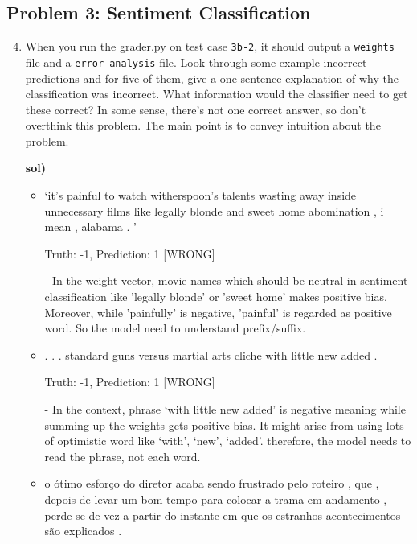 \documentclass[a4paper]{article}
\begin{document}
\subsection*{Problem 3: Sentiment Classification}
    \begin{enumerate}[label=\alph*.]
        \setcounter{enumi}{3}
        \item   When you run the grader.py on test case \texttt{3b-2}, it should output a \texttt{weights}
        file and a \texttt{error-analysis} file.
        Look through some example incorrect predictions and for five of them,
        give a one-sentence explanation of why the classification was incorrect.
        What information would the classifier need to get these correct?
        In some sense, there's not one correct answer, so don't overthink this problem.
        The main point is to convey intuition about the problem.

        \medskip \textbf{sol)}

        \begin{itemize}
            \item `it's painful to watch witherspoon's talents wasting away inside unnecessary films like legally blonde and sweet home abomination , i mean , alabama . '
            
            Truth: -1, Prediction: 1 [WRONG]

            - In the weight vector, movie names which should be neutral in sentiment classification like 'legally blonde' or 'sweet home' makes positive bias.
            Moreover, while 'painfully' is negative, 'painful' is regarded as positive word. So the model need to understand prefix/suffix. 
        
            \item . . . standard guns versus martial arts cliche with little new added .
            
            Truth: -1, Prediction: 1 [WRONG]

            - In the context, phrase `with little new added' is negative meaning while summing up the weights gets positive bias.
            It might arise from using lots of optimistic word like `with', `new', `added'. therefore, the model needs to read the phrase, not each word.
        
            \item o ótimo esforço do diretor acaba sendo frustrado pelo roteiro , que , depois de levar um bom tempo para colocar a trama em andamento , perde-se de vez a partir do instante em que os estranhos acontecimentos são explicados .
            

\end{itemize}
\end{enumerate}
\end{document}
